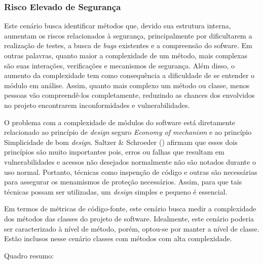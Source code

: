 \subsubsection{Risco Elevado de Segurança}

Este cenário busca identificar métodos que, devido sua estrutura interna, aumentam os riscos relacionados à segurança, principalmente por dificultarem a realização de testes, a busca de \emph{bugs} existentes e a compreensão do sofware. Em outras palavras, quanto maior a complexidade de um método, mais complexas são suas interações, verificações e mecanismos de segurança. Além disso, o aumento da complexidade tem como consequência a dificuldade de se entender o módulo em análise. Assim, quanto mais complexo um método ou classe, menos pessoas vão compreendê-los completamente, reduzindo as chances dos envolvidos no projeto encontrarem inconformidades e vulnerabilidades.

%

O problema com a complexidade de módulos do software está diretamente relacionado ao princípio de \emph{design} seguro \emph{Economy of mechanism} e ao princípio Simplicidade de bom \emph{design}. Saltzer \& Schroeder (\citeyear{schroeder1975}) afirmam que esses dois princípios são muito importantes pois, erros ou falhas que resultam em vulnerabilidades e acessos não desejados normalmente não são notados durante o uso normal. Portanto, técnicas como inspenção de código e outras são necessárias para assegurar os menamismos de proteção necessários. Assim, para que tais técnicas possam ser utilizadas, um \emph{design} simples e pequeno é essencial.

%

Em termos de métricas de código-fonte, este cenário busca medir a complexidade dos métodos das classes do projeto de software. Idealmente, este cenário poderia ser caracterizado à nível de método, porém, optou-se por manter a nível de classe. Estão inclusos nesse cenário classes com métodos com alta complexidade. 

%

Quadro resumo:

